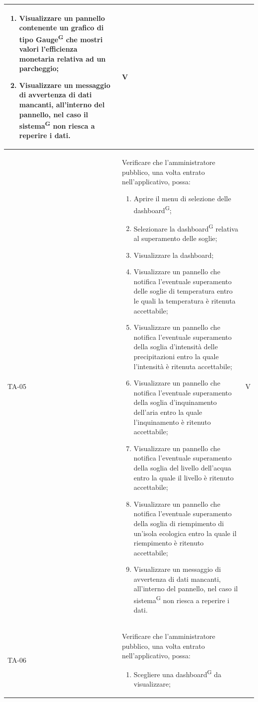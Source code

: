 \documentclass[8pt]{article}
\newcommand{\glossterm}[1]{#1\textsuperscript{G}} %
\begin{document}
\begin{longtable}{|>{\centering}p{2cm}|>{\RaggedRight}m{12cm}|>{\centering\arraybackslash}p{2cm}|}
\begin{enumerate}
        \item Visualizzare un pannello contenente un grafico di tipo \glossterm{Gauge} che mostri valori l'efficienza monetaria relativa ad un parcheggio;
        \item Visualizzare un messaggio di avvertenza di dati mancanti, all’interno del pannello, nel caso il \glossterm{sistema} non riesca a reperire i dati.
    \end{enumerate}
    & V \\
    \hline
    TA-05 & Verificare che l'amministratore pubblico, una volta entrato nell'applicativo, possa:
    \begin{enumerate}
        \setlength\itemsep{0em}
        \item Aprire il menu di selezione delle \glossterm{dashboard};
        \item Selezionare la \glossterm{dashboard} relativa al superamento delle soglie;
        \item Visualizzare la dashboard;
        \item Visualizzare un pannello che notifica l'eventuale superamento delle soglie di temperatura entro le quali la temperatura è ritenuta accettabile;
        \item Visualizzare un pannello che notifica l'eventuale superamento della soglia d'intensità delle precipitazioni entro la quale l'intensità è ritenuta accettabile;
        \item Visualizzare un pannello che notifica l'eventuale superamento della soglia d'inquinamento dell'aria entro la quale l'inquinamento è ritenuto accettabile;
        \item Visualizzare un pannello che notifica l'eventuale superamento della soglia del livello dell'acqua entro la quale il livello è ritenuto accettabile;
        \item Visualizzare un pannello che notifica l'eventuale superamento della soglia di riempimento di un'isola ecologica entro la quale il riempimento è ritenuto accettabile;
        \item Visualizzare un messaggio di avvertenza di dati mancanti, all’interno del pannello, nel caso il \glossterm{sistema} non riesca a reperire i dati.
    \end{enumerate}
    & V \\
    \hline
    TA-06 & Verificare che l'amministratore pubblico, una volta entrato nell’applicativo, possa:
    \begin{enumerate}
        \item Scegliere una \glossterm{dashboard} da visualizzare;

\end{enumerate}
\end{longtable}
\end{document}
